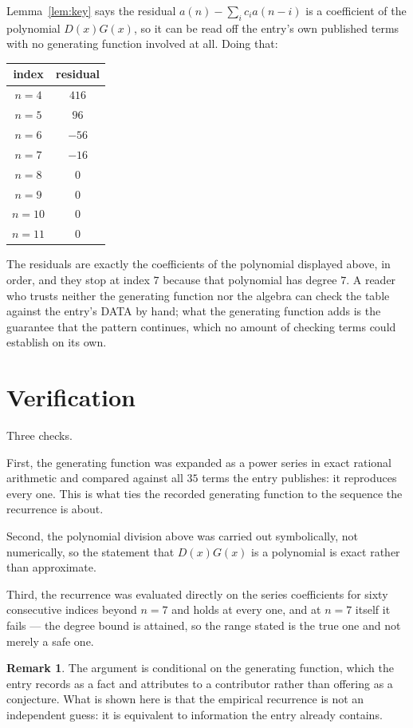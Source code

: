 \documentclass[11pt,a4paper]{article}
\theoremstyle{plain}
\theoremstyle{definition}
\newtheorem{remark}[theorem]{Remark}
\begin{document}
Lemma~\ref{lem:key} says the residual $a(n)-\sum_ic_ia(n-i)$ is a coefficient of the
polynomial $D(x)G(x)$, so it can be read off the entry's own published terms with no
generating function involved at all. Doing that:
\begin{center}
\begin{tabular}{cc}
index & residual \\ \hline
$n=4$ & $416$ \\
$n=5$ & $96$ \\
$n=6$ & $-56$ \\
$n=7$ & $-16$ \\
$n=8$ & $0$ \\
$n=9$ & $0$ \\
$n=10$ & $0$ \\
$n=11$ & $0$
\end{tabular}
\end{center}
The residuals are exactly the coefficients of the polynomial displayed above, in order, and
they stop at index $7$ because that polynomial has degree $7$. A reader who trusts
neither the generating function nor the algebra can check the table against the entry's DATA
by hand; what the generating function adds is the guarantee that the pattern continues, which
no amount of checking terms could establish on its own.

\section{Verification}

Three checks.

First, the generating function was expanded as a power series in exact rational arithmetic and
compared against all $35$ terms the entry publishes: it reproduces every one. This is
what ties the recorded generating function to the sequence the recurrence is about.

Second, the polynomial division above was carried out symbolically, not numerically, so the
statement that $D(x)G(x)$ is a polynomial is exact rather than approximate.

Third, the recurrence was evaluated directly on the series coefficients for sixty consecutive
indices beyond $n=7$ and holds at every one, and at $n=7$ itself it fails --- the
degree bound is attained, so the range stated is the true one and not merely a safe one.

\begin{remark}
The argument is conditional on the generating function, which the entry records as a fact and
attributes to a contributor rather than offering as a conjecture. What is shown here is that
the empirical recurrence is not an independent guess: it is equivalent to information the
entry already contains.
\end{remark}
\end{document}
